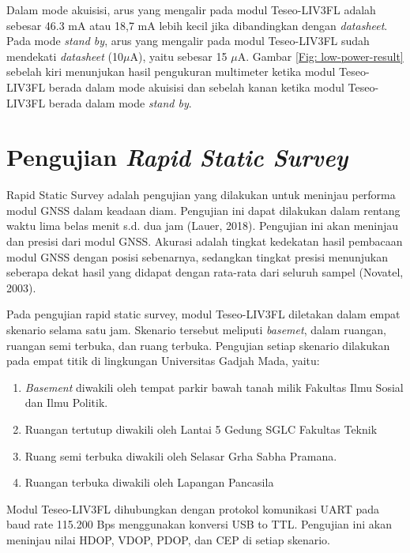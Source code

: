 Dalam mode akuisisi, arus yang mengalir pada modul Teseo-LIV3FL adalah sebesar 46.3 mA atau  18,7 mA lebih kecil jika dibandingkan dengan \textit{datasheet}. Pada mode \textit{stand by}, arus yang mengalir pada modul Teseo-LIV3FL sudah mendekati \textit{datasheet} (10$\mu$A), yaitu sebesar 15 $\mu$A. Gambar \ref{Fig: low-power-result} sebelah kiri menunjukan hasil pengukuran multimeter ketika modul Teseo-LIV3FL berada dalam mode akuisisi dan sebelah kanan ketika modul Teseo-LIV3FL berada dalam mode \textit{stand by}.

\section{Pengujian \textit{Rapid Static Survey}}
Rapid Static Survey adalah pengujian yang dilakukan untuk meninjau performa modul GNSS dalam keadaan diam. Pengujian ini dapat dilakukan dalam rentang waktu lima belas menit s.d. dua jam (Lauer, 2018). Pengujian ini akan meninjau  dan presisi dari modul GNSS. Akurasi adalah tingkat kedekatan hasil pembacaan modul GNSS dengan posisi sebenarnya, sedangkan tingkat presisi menunjukan seberapa dekat hasil yang didapat dengan rata-rata dari seluruh sampel (Novatel, 2003).

Pada pengujian rapid static survey, modul Teseo-LIV3FL diletakan dalam empat skenario selama satu jam. Skenario tersebut meliputi \textit{basemet}, dalam ruangan, ruangan semi terbuka, dan ruang terbuka. Pengujian setiap skenario dilakukan pada empat titik di lingkungan Universitas Gadjah Mada, yaitu:
\begin{enumerate}
	\item \textit{Basement} diwakili oleh tempat parkir bawah tanah milik Fakultas Ilmu Sosial dan Ilmu Politik.
	\item Ruangan tertutup diwakili oleh Lantai 5 Gedung SGLC Fakultas Teknik
	\item Ruang semi terbuka diwakili oleh Selasar Grha Sabha Pramana.
	\item Ruangan terbuka diwakili oleh Lapangan Pancasila
\end{enumerate}

Modul Teseo-LIV3FL dihubungkan dengan protokol komunikasi UART pada baud rate 115.200 Bps menggunakan konversi USB to TTL. Pengujian ini akan meninjau nilai HDOP, VDOP, PDOP, dan CEP di setiap skenario.


